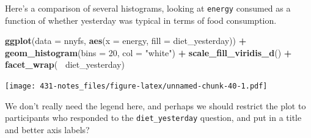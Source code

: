 \documentclass[
]{book}
\newenvironment{Shaded}{\begin{snugshade}}{\end{snugshade}}
\newcommand{\DataTypeTok}[1]{\textcolor[rgb]{0.13,0.29,0.53}{#1}}
\newcommand{\DecValTok}[1]{\textcolor[rgb]{0.00,0.00,0.81}{#1}}
\newcommand{\KeywordTok}[1]{\textcolor[rgb]{0.13,0.29,0.53}{\textbf{#1}}}
\newcommand{\NormalTok}[1]{#1}
\newcommand{\OperatorTok}[1]{\textcolor[rgb]{0.81,0.36,0.00}{\textbf{#1}}}
\newcommand{\OtherTok}[1]{\textcolor[rgb]{0.56,0.35,0.01}{#1}}
\newcommand{\StringTok}[1]{\textcolor[rgb]{0.31,0.60,0.02}{#1}}
\begin{document}
Here's a comparison of several histograms, looking at \texttt{energy} consumed as a function of whether yesterday was typical in terms of food consumption.

\begin{Shaded}
\begin{Highlighting}[]
\KeywordTok{ggplot}\NormalTok{(}\DataTypeTok{data =}\NormalTok{ nnyfs, }\KeywordTok{aes}\NormalTok{(}\DataTypeTok{x =}\NormalTok{ energy, }\DataTypeTok{fill =}\NormalTok{ diet_yesterday)) }\OperatorTok{+}
\StringTok{  }\KeywordTok{geom_histogram}\NormalTok{(}\DataTypeTok{bins =} \DecValTok{20}\NormalTok{, }\DataTypeTok{col =} \StringTok{"white"}\NormalTok{) }\OperatorTok{+}
\StringTok{  }\KeywordTok{scale_fill_viridis_d}\NormalTok{() }\OperatorTok{+}
\StringTok{  }\KeywordTok{facet_wrap}\NormalTok{(}\OperatorTok{~}\StringTok{ }\NormalTok{diet_yesterday)}
\end{Highlighting}
\end{Shaded}

\texttt{[image: 431-notes\_files/figure-latex/unnamed-chunk-40-1.pdf]}

We don't really need the legend here, and perhaps we should restrict the plot to participants who responded to the \texttt{diet\_yesterday} question, and put in a title and better axis labels?

\begin{Shaded}
\end{Shaded}
\end{document}
